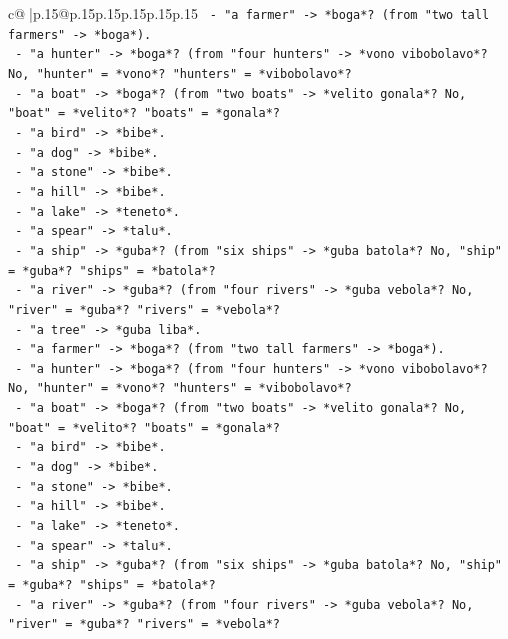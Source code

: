 \documentclass{article}
\begin{document}
{\begin{supertabular}{c@{$\;$}|p{.15\linewidth}@{}p{.15\linewidth}p{.15\linewidth}p{.15\linewidth}p{.15\linewidth}p{.15\linewidth}}
{{{\texttt{      {-} "a farmer" {-}> *boga*? (from "two tall farmers" {-}> *boga*).} \\
\texttt{      {-} "a hunter" {-}> *boga*? (from "four hunters" {-}> *vono vibobolavo*? No, "hunter" = *vono*? "hunters" = *vibobolavo*?} \\
\texttt{      {-} "a boat" {-}> *boga*? (from "two boats" {-}> *velito gonala*? No, "boat" = *velito*? "boats" = *gonala*?} \\
\texttt{      {-} "a bird" {-}> *bibe*.} \\
\texttt{      {-} "a dog" {-}> *bibe*.} \\
\texttt{      {-} "a stone" {-}> *bibe*.} \\
\texttt{      {-} "a hill" {-}> *bibe*.} \\
\texttt{      {-} "a lake" {-}> *teneto*.} \\
\texttt{      {-} "a spear" {-}> *talu*.} \\
\texttt{      {-} "a ship" {-}> *guba*? (from "six ships" {-}> *guba batola*? No, "ship" = *guba*? "ships" = *batola*?} \\
\texttt{      {-} "a river" {-}> *guba*? (from "four rivers" {-}> *guba vebola*? No, "river" = *guba*? "rivers" = *vebola*?} \\
\texttt{      {-} "a tree" {-}> *guba liba*.} \\
\texttt{      {-} "a farmer" {-}> *boga*? (from "two tall farmers" {-}> *boga*).} \\
\texttt{      {-} "a hunter" {-}> *boga*? (from "four hunters" {-}> *vono vibobolavo*? No, "hunter" = *vono*? "hunters" = *vibobolavo*?} \\
\texttt{      {-} "a boat" {-}> *boga*? (from "two boats" {-}> *velito gonala*? No, "boat" = *velito*? "boats" = *gonala*?} \\
\texttt{      {-} "a bird" {-}> *bibe*.} \\
\texttt{      {-} "a dog" {-}> *bibe*.} \\
\texttt{      {-} "a stone" {-}> *bibe*.} \\
\texttt{      {-} "a hill" {-}> *bibe*.} \\
\texttt{      {-} "a lake" {-}> *teneto*.} \\
\texttt{      {-} "a spear" {-}> *talu*.} \\
\texttt{      {-} "a ship" {-}> *guba*? (from "six ships" {-}> *guba batola*? No, "ship" = *guba*? "ships" = *batola*?} \\
\texttt{      {-} "a river" {-}> *guba*? (from "four rivers" {-}> *guba vebola*? No, "river" = *guba*? "rivers" = *vebola*?} \\
}}}
\end{supertabular}}
\end{document}
